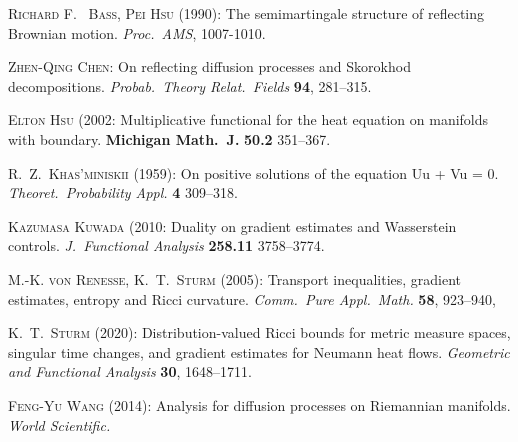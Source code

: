 \documentclass[a4paper,12pt]{article}
\theoremstyle{plain}
\begin{document}
\begin{thebibliography}{St05a}


 \textsc{Richard F.~ Bass, Pei Hsu (1990)}:
 The semimartingale structure of reflecting Brownian motion.
 \textit{Proc.~AMS}, 1007-1010.
 
 \textsc{Zhen-Qing Chen}:
On reflecting diffusion processes and
Skorokhod decompositions.
 \textit{Probab.~Theory Relat.~Fields} {\bf 94}, 281--315.
 
 \textsc{Elton Hsu (2002}:
 Multiplicative functional for the heat equation on manifolds with boundary. 
 {\bf Michigan Math.~J.} {\bf 50.2} 351--367.
  
 \textsc{R.~Z.~Khas'miniskii (1959)}: On positive solutions of the equation Uu + Vu = 0.
 \textit{Theoret.~Probability
Appl.} {\bf 4} 309--318.


 \textsc{Kazumasa Kuwada (2010}:
 Duality on gradient estimates and Wasserstein controls.
 \textit{J.~Functional Analysis} {\bf 258.11} 3758--3774.

 
 \textsc{M.-K. von Renesse, K.~T.~Sturm (2005)}:
{Transport inequalities, gradient estimates, entropy and Ricci curvature}.
\textit{Comm.~Pure Appl.~Math.}
  {\bf 58},
 {923--940},
 
   \textsc{K.~T.~Sturm (2020)}:
Distribution-valued Ricci bounds for metric measure spaces, singular time changes, and gradient estimates for Neumann heat flows. \textit{Geometric and Functional Analysis} {\bf 30}, 1648--1711.

   \textsc{Feng-Yu Wang (2014)}:
    Analysis for diffusion processes on Riemannian manifolds. 
    \textit{World Scientific.}
\end{thebibliography}
\end{document}

